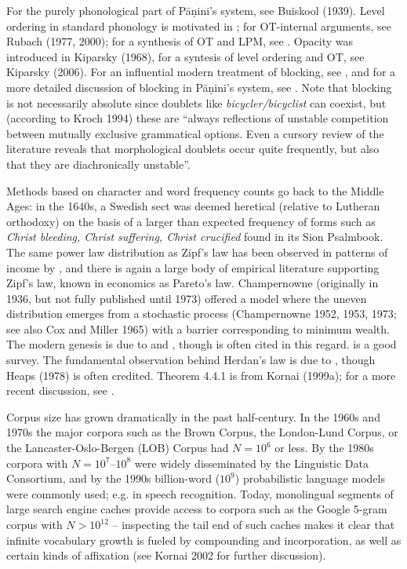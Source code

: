 For the purely phonological part of P\={a}\d{n}ini's system, see Buiskool
(1939). \nocite{Buiskool:1939} Level ordering in standard phonology is
motivated in ; for OT-internal arguments, see Rubach
(1977, 2000); for a synthesis of OT and LPM, see
.\nocite{Rubach:1997} \nocite{Rubach:2000} Opacity was
introduced in Kiparsky (1968),\nocite{Kiparsky:1968} for a syntesis of level
ordering and OT, see Kiparsky (2006).\nocite{Kiparsky:2006} For an influential
modern treatment of blocking, see , and for a more
detailed discussion of blocking in P\={a}\d{n}ini's system, see
. Note that blocking is not necessarily absolute since
doublets like {\it bicycler/bicyclist} can coexist, but (according to Kroch
1994) these are ``always reflections of unstable competition between mutually
exclusive grammatical options. Even a cursory review of the literature reveals
that morphological doublets occur quite frequently, but also that they are
diachronically unstable''.\nocite{Kroch:1994}

Methods based on character and word frequency counts go back to the Middle
Ages: in the 1640s, a Swedish sect was deemed heretical (relative to Lutheran
orthodoxy) on the basis of a larger than expected frequency of forms such as
{\it Christ bleeding, Christ suffering, Christ crucified} found in its Sion
Psalmbook.  The same power law distribution as Zipf's law has been observed in
patterns of income by , and there is again a large body
of empirical literature supporting Zipf's law, known in economics as Pareto's
law. Champernowne (originally in 1936, but not fully published until 1973)
offered a model where the uneven distribution emerges from a stochastic
process (Champernowne 1952, 1953, 1973; see also Cox and Miller 1965) with a
barrier corresponding to minimum wealth.\nocite{Champernowne:1952}
\nocite{Champernowne:1953}\nocite{Champernowne:1973}\nocite{Cox:1965} The
modern genesis is due to  and ,
though  is often cited in this regard.
 is a good survey. The fundamental observation
behind Herdan's law is due to , though Heaps (1978) is
often credited. Theorem 4.4.1 is from Kornai (1999a);\nocite{Kornai:1999a} for
a more recent discussion, see .

Corpus size has grown dramatically in the past half-century. In the 1960s and
1970s the major corpora such as the Brown Corpus, the London-Lund Corpus, or
the Lancaster-Oslo-Bergen (LOB) Corpus had $N=10^6$ or less. By the 1980s
corpora with $N=10^7$--$10^8$ were widely disseminated by the Linguistic Data
Consortium, and by the 1990s billion-word ($10^9$) probabilistic language
models were commonly used; e.g. in speech recognition.  Today, monolingual
segments of large search engine caches provide access to corpora such as the
Google 5-gram corpus with $N > 10^{12}$ -- inspecting the tail end of such
caches makes it clear that infinite vocabulary growth is fueled by compounding
and incorporation, as well as certain kinds of affixation (see Kornai 2002 for
further discussion).\nocite{Kornai:2002}

\endinput
